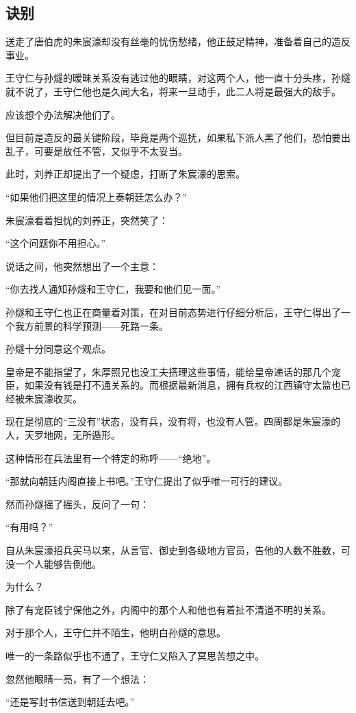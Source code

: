 \begin{multicols}{\theparacolNo}
\subsection{诀别}
送走了唐伯虎的朱宸濠却没有丝毫的忧伤愁绪，他正鼓足精神，准备着自己的造反事业。

王守仁与孙燧的暧昧关系没有逃过他的眼睛，对这两个人，他一直十分头疼，孙燧就不说了，王守仁他也是久闻大名，将来一旦动手，此二人将是最强大的敌手。

应该想个办法解决他们了。

但目前是造反的最关键阶段，毕竟是两个巡抚，如果私下派人黑了他们，恐怕要出乱子，可要是放任不管，又似乎不太妥当。

此时，刘养正却提出了一个疑虑，打断了朱宸濠的思索。

“如果他们把这里的情况上奏朝廷怎么办？”

朱宸濠看着担忧的刘养正，突然笑了：

“这个问题你不用担心。”

说话之间，他突然想出了一个主意：

“你去找人通知孙燧和王守仁，我要和他们见一面。”

孙燧和王守仁也正在商量着对策，在对目前态势进行仔细分析后，王守仁得出了一个我方前景的科学预测——死路一条。

孙燧十分同意这个观点。

皇帝是不能指望了，朱厚照兄也没工夫搭理这些事情，能给皇帝递话的那几个宠臣，如果没有钱是打不通关系的。而根据最新消息，拥有兵权的江西镇守太监也已经被朱宸濠收买。

现在是彻底的“三没有”状态，没有兵，没有将，也没有人管。四周都是朱宸濠的人，天罗地网，无所遁形。

这种情形在兵法里有一个特定的称呼——“绝地”。

“那就向朝廷内阁直接上书吧。”王守仁提出了似乎唯一可行的建议。

然而孙燧摇了摇头，反问了一句：

“有用吗？”

自从朱宸濠招兵买马以来，从言官、御史到各级地方官员，告他的人数不胜数，可没一个人能够告倒他。

为什么？

除了有宠臣钱宁保他之外，内阁中的那个人和他也有着扯不清道不明的关系。

对于那个人，王守仁并不陌生，他明白孙燧的意思。

唯一的一条路似乎也不通了，王守仁又陷入了冥思苦想之中。

忽然他眼睛一亮，有了一个想法：

“还是写封书信送到朝廷去吧。”


\end{multicols}
